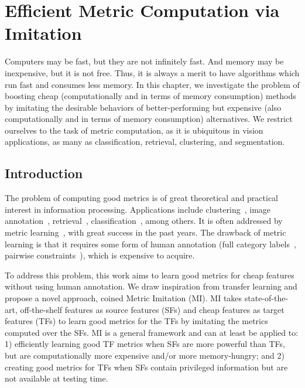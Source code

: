\chapter{Efficient Metric Computation via Imitation}
\label{ch:mi}
Computers may be fast, but they are not infinitely fast. And memory may be inexpensive, but it is not free. 
Thus, it is always a merit to have algorithms which run fast and consumes less memory. In this chapter, we investigate the problem of
boosting  cheap (computationally and in terms of memory consumption) methods by imitating the desirable behaviors of better-performing but expensive (also computationally and in terms of memory consumption) alternatives.  
We restrict ourselves  to the task of metric computation, as it is ubiquitous in vision applications, as many as classification, retrieval, clustering, and segmentation.    

\section{Introduction}

The problem of computing good metrics is of great theoretical and
practical interest in information processing. Applications include
clustering~\citep{metric:nips03, metric:clustering:12}, image
annotation~\citep{tagprop:iccv09},
retrieval~\citep{local_distance:iccv:07, ml:fast:search:09},
classification~\citep{eigenface:pami97, local_distance:iccv:07,
  max:margin:knn}, among others.  It is often addressed by metric
learning~\citep{pairwise:metric:IJCAI09, large:scale:metric:cvpr12,
  tagprop:iccv09, max:margin:knn, qin:bmvc14}, with great success in
the past years. The drawback of metric learning is that it requires
some form of human annotation (\eg full category
labels~\citep{eigenface:pami97, local_distance:iccv:07, max:margin:knn,
  mlrank:10}, pairwise constraints~\citep{pairwise:metric:IJCAI09,
  ml:fast:search:09, large:scale:metric:cvpr12,
  fetlearn:convex:pami14}), which is expensive to acquire.

To address this problem, this work aims to learn good metrics for cheap features without
using human annotation. We draw inspiration from transfer learning and
propose a novel approach, coined Metric Imitation (MI). 
MI takes state-of-the-art, off-the-shelf features as source features (SFs) and cheap features 
as target features (TFs) to learn good
metrics for the TFs by imitating the metrics computed
over the SFs. MI is a general framework and can at least
be applied to: 1) efficiently learning good TF metrics when
SFs are more powerful than TFs, but are computationally more expensive
and/or more memory-hungry; and 2) creating good metrics for TFs when SFs
contain privileged information but are not available at testing time. 


